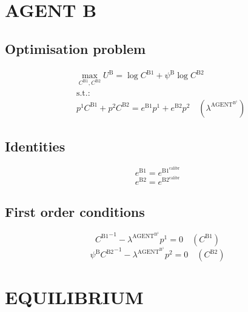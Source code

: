 \section{AGENT B}

\subsection{Optimisation problem}

\begin{align}
&\max_{C^{\mathrm{B1}}, C^{\mathrm{B2}}
} U^{\mathrm{B}} = \log{C^{\mathrm{B1}}} + {\psi^{\mathrm{B}}} {\log{C^{\mathrm{B2}}}}\\
&\mathrm{s.t.:}\nonumber\\
& {p^{\mathrm{1}}} {C^{\mathrm{B1}}} + {p^{\mathrm{2}}} {C^{\mathrm{B2}}} = {e^{\mathrm{B1}}} {p^{\mathrm{1}}} + {e^{\mathrm{B2}}} {p^{\mathrm{2}}} \quad \left(\lambda^{\mathrm{AGENT}^{\mathrm{B}^{\mathrm{1}}}}\right)
\end{align}


\subsection{Identities}

\begin{equation}
e^{\mathrm{B1}} = e^{\mathrm{B1}^{\mathrm{calibr}}}
\end{equation}
\begin{equation}
e^{\mathrm{B2}} = e^{\mathrm{B2}^{\mathrm{calibr}}}
\end{equation}


\subsection{First order conditions}

\begin{equation}
{C^{\mathrm{B1}}}^{-1} - {\lambda^{\mathrm{AGENT}^{\mathrm{B}^{\mathrm{1}}}}} {p^{\mathrm{1}}} = 0
 \quad \left(C^{\mathrm{B1}}\right)
\end{equation}
\begin{equation}
{\psi^{\mathrm{B}}} {C^{\mathrm{B2}}}^{-1} - {\lambda^{\mathrm{AGENT}^{\mathrm{B}^{\mathrm{1}}}}} {p^{\mathrm{2}}} = 0
 \quad \left(C^{\mathrm{B2}}\right)
\end{equation}




\section{EQUILIBRIUM}

